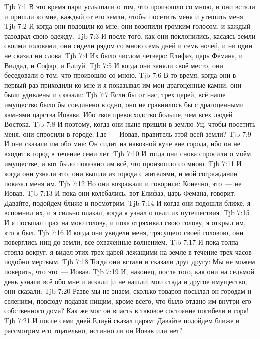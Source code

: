\vs Tjb 7:1
В это время цари услышали о том, что произошло со мною, и они встали и пришли ко мне, каждый от его земли, чтобы посетить меня и утешить меня.
\vs Tjb 7:2
И когда они подошли ко мне, они возопили громким голосом, и каждый разодрал свою одежду.
\vs Tjb 7:3
И после того, как они поклонились, касаясь земли своими головами, они сидели рядом со мною семь дней и семь ночей, и ни один не сказал ни слова.
\vs Tjb 7:4
Их было числом четверо: Елифаз, царь Фемана, и Вилдад, и Софар, и Елиуй.
\vs Tjb 7:5
И когда они заняли своё место, они беседовали о том, что произошло со мною.
\vs Tjb 7:6
В то время, когда они в первый раз приходили ко мне и я показывал им мои драгоценные камни, они были удивлены и сказали:
\vs Tjb 7:7
Если бы от нас, трех царей, всё наше имущество было бы соединено в одно, оно не сравнилось бы с драгоценными камнями царства Иовава. Ибо твое превосходство больше, чем всех людей Востока.
\vs Tjb 7:8
И поэтому, когда они ныне пришли в землю Уц, чтобы посетить меня, они спросили в городе: Где~--- Иовав, правитель этой всей земли?
\vs Tjb 7:9
И они сказали им обо мне: Он сидит на навозной куче вне города, ибо он не входит в город в течение семи лет.
\vs Tjb 7:10
И тогда они снова спросили о моём имуществе, и вот было показано им всё, что произошло со мною.
\vs Tjb 7:11
И когда они узнали это, они вышли из города с жителями, и мой согражданин показал меня им.
\vs Tjb 7:12
Но они возражали и говорили: Конечно, это~--- не Иовав.
\vs Tjb 7:13
И пока они колебались, вот Елифаз, царь Фемана, говорит: Давайте, подойдем ближе и посмотрим.
\vs Tjb 7:14
И когда они подошли ближе, я вспомнил их, и я сильно плакал, когда я узнал о цели их путешествия.
\vs Tjb 7:15
И я посыпал прах на мою голову, и пока отряхивал свою голову, я открыл им, кто я был.
\vs Tjb 7:16
И когда они увидели меня, трясущего своей головою, они поверглись ниц до земли, все охваченные волнением.
\vs Tjb 7:17
И пока толпа стояла вокруг, я видел этих трех царей лежащими на земле в течение трех часов подобно мертвым.
\vs Tjb 7:18
Тогда они встали и сказали друг другу: Мы не можем поверить, что это~--- Иовав.
\vs Tjb 7:19
И, наконец, после того, как они на седьмой день узнали всё обо мне и искали [и не нашли] мои стада и другое имущество, они сказали:
\vs Tjb 7:20
Разве мы не знаем, сколько товаров посылал он городам и селениям, повсюду подавая нищим, кроме всего, что было отдано им внутри его собственного дома? Как же мог он впасть в таковое состояние погибели и горя!
\vs Tjb 7:21
И после семи дней Елиуй сказал царям: Давайте подойдем ближе и рассмотрим его тщательно, истинно ли он Иовав или нет?

